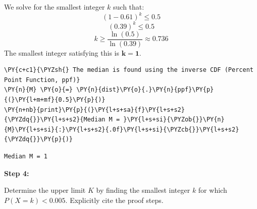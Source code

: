 \cite{con:coursebook}

We solve for the smallest integer \(k\) such that:
\[ (1-0.61)^k \le 0.5 \] \[ (0.39)^k \le 0.5 \]
\[ k \ge \frac{\ln(0.5)}{\ln(0.39)} \approx 0.736 \] The smallest
integer satisfying this is \(\mathbf{k=1}\).

    \begin{tcolorbox}[breakable, size=fbox, boxrule=1pt, pad at break*=1mm,colback=cellbackground, colframe=cellborder]
\begin{Verbatim}[commandchars=\\\{\}]
\PY{c+c1}{\PYZsh{} The median is found using the inverse CDF (Percent Point Function, ppf)}
\PY{n}{M} \PY{o}{=} \PY{n}{dist}\PY{o}{.}\PY{n}{ppf}\PY{p}{(}\PY{l+m+mf}{0.5}\PY{p}{)}
\PY{n+nb}{print}\PY{p}{(}\PY{l+s+sa}{f}\PY{l+s+s2}{\PYZdq{}}\PY{l+s+s2}{Median M = }\PY{l+s+si}{\PYZob{}}\PY{n}{M}\PY{l+s+si}{:}\PY{l+s+s2}{.0f}\PY{l+s+si}{\PYZcb{}}\PY{l+s+s2}{\PYZdq{}}\PY{p}{)}
\end{Verbatim}
\end{tcolorbox}

    \begin{Verbatim}[commandchars=\\\{\}]
Median M = 1
    \end{Verbatim}

    \textbf{Step 4:}

Determine the upper limit \(K\) by finding the smallest integer \(k\)
for which \(P(X=k) < 0.005\). Explicitly cite the proof steps.

